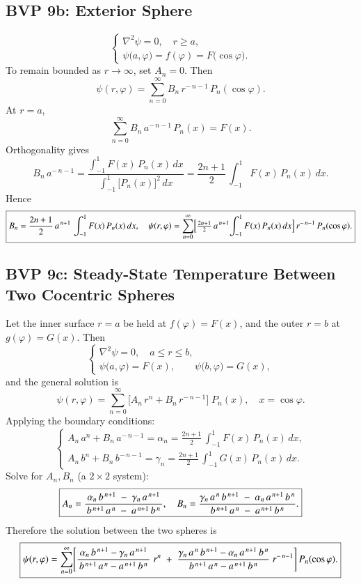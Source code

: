 \documentclass{report}
\begin{document}
\subsection{BVP 9b: Exterior Sphere}

\[
\begin{cases}
\nabla^{2}\psi = 0, 
\quad r \ge a,\\
\psi\bigl(a,\varphi\bigr) = f(\varphi) = F\bigl(\cos\varphi\bigr).
\end{cases}
\]
To remain bounded as \(r \to \infty\), set \(A_{n}=0\).  Then
\[
\psi(r,\varphi) 
= 
\sum_{n=0}^{\infty} B_{n}\,r^{-\,n-1}\,P_{n}(\cos\varphi).
\]
At \(r=a\),
\[
\sum_{n=0}^{\infty} B_{n}\,a^{-\,n-1}\,P_{n}(x) 
= F(x).
\]
Orthogonality gives
\[
B_{n}\,a^{-\,n-1} 
= 
\frac{\displaystyle\int_{-1}^{1}F(x)\,P_{n}(x)\,dx}
     {\displaystyle\int_{-1}^{1}\bigl[P_{n}(x)\bigr]^{2}\,dx}
= 
\frac{2n+1}{2}\,
\int_{-1}^{1}F(x)\,P_{n}(x)\,dx.
\]
Hence
\[
\boxed{%
B_{n} 
= 
\frac{2n+1}{2}\,a^{\,n+1}\,
\int_{-1}^{1}F(x)\,P_{n}(x)\,dx,
\quad
\psi(r,\varphi)
= \sum_{n=0}^{\infty}
\Bigl[\tfrac{2n+1}{2}\,a^{\,n+1}\!
\int_{-1}^{1}F(x)\,P_{n}(x)\,dx\Bigr]\,r^{-\,n-1}\,P_{n}(\cos\varphi).
}
\]

\subsection{BVP 9c: Steady-State Temperature Between Two Cocentric Spheres}

Let the inner surface \(r=a\) be held at \(f(\varphi) = F(x)\), and the outer \(r=b\) at \(g(\varphi) = G(x)\).  Then
\[
\begin{cases}
\nabla^{2}\psi = 0, 
\quad a \le r \le b,\\
\psi\bigl(a,\varphi\bigr) = F(x),\qquad
\psi\bigl(b,\varphi\bigr) = G(x),
\end{cases}
\]
and the general solution is
\[
\psi(r,\varphi)
= \sum_{n=0}^{\infty}
\bigl[A_{n}\,r^{n} + B_{n}\,r^{-\,n-1}\bigr]\;P_{n}(x),
\quad x=\cos\varphi.
\]
Applying the boundary conditions:
\[
\begin{cases}
A_{n}\,a^{n} + B_{n}\,a^{-\,n-1}
= 
\alpha_{n}
= 
\frac{2n+1}{2}\,
\int_{-1}^{1}F(x)\,P_{n}(x)\,dx, 
\\
A_{n}\,b^{n} + B_{n}\,b^{-\,n-1}
= 
\gamma_{n}
= 
\frac{2n+1}{2}\,
\int_{-1}^{1}G(x)\,P_{n}(x)\,dx.
\end{cases}
\]
Solve for \(A_{n},B_{n}\) (a \(2\times2\) system):
\[
\boxed{%
A_{n} 
= 
\frac{\alpha_{n}\,b^{\,n+1} \;-\; \gamma_{n}\,a^{\,n+1}}
     {\,b^{\,n+1}\,a^{\,n} \;-\; a^{\,n+1}\,b^{\,n}\,},
\quad
B_{n} 
= 
\frac{\gamma_{n}\,a^{\,n}\,b^{\,n+1} \;-\; \alpha_{n}\,a^{\,n+1}\,b^{\,n}}
     {\,b^{\,n+1}\,a^{\,n} \;-\; a^{\,n+1}\,b^{\,n}\,}.
}
\]
Therefore the solution between the two spheres is
\[
\boxed{%
\psi(r,\varphi)
= 
\sum_{n=0}^{\infty}
\Biggl[
\frac{\alpha_{n}\,b^{\,n+1} - \gamma_{n}\,a^{\,n+1}}
     {\,b^{\,n+1}\,a^{\,n} - a^{\,n+1}\,b^{\,n}\,}\;r^{n}
\;+\;
\frac{\gamma_{n}\,a^{\,n}\,b^{\,n+1} - \alpha_{n}\,a^{\,n+1}\,b^{\,n}}
     {\,b^{\,n+1}\,a^{\,n} - a^{\,n+1}\,b^{\,n}\,}\;r^{-\,n-1}
\Biggr]\,P_{n}(\cos\varphi).
}
\]
\end{document}
